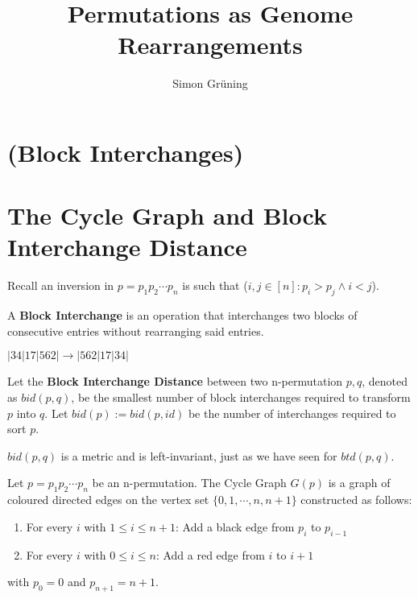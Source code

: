 


\title{Permutations as Genome Rearrangements}
\author{Simon Gr\"uning}
\address[Simon Gr\"uning]{University of Zurich, R\"{a}mistrasse 71, 8006 Zurich}


\maketitle

\section*{(Block Interchanges)}


\clearpage




\section{The Cycle Graph and Block Interchange Distance}

\begin{remark}
Recall an inversion in $p = p_1 p_2 \cdots p_n $ is such that ($ i,j \in [ n ] : p_i > p_j \wedge i < j$).
\end{remark}

\begin{definition}
A \textbf{Block Interchange} is an operation that interchanges two blocks of consecutive entries without rearranging said entries.
\end{definition}

\begin{example}
 $ |34|17|562| \rightarrow |562|17|34| $
\end{example}

\begin{definition}
Let the \textbf{Block Interchange Distance} between two n-permutation $p,q$, denoted as $bid(p,q)$, be the smallest number of block interchanges required to transform $p$ into $q$. Let $bid(p) := bid(p,id)$ be the number of interchanges required to sort $p$.
\end{definition}

\begin{remark}
$bid(p,q)$ is a metric and is left-invariant, just as we have seen for $btd(p,q)$.
\end{remark}

\begin{definition}
Let $p = p_1 p_2 \cdots p_n$ be an n-permutation. The  Cycle Graph $G(p)$ is a graph of coloured directed edges on the vertex set $\{ 0,1, \cdots ,n,n+1 \}$ constructed as follows:
\begin{enumerate}
\item For every $i$ with $1 \leq i \leq n+1$: Add a black edge from $p_i$ to $p_{i-1}$
\item For every $i$ with $0 \leq i \leq n$: Add a red edge from $i$ to $i+1$
\end{enumerate}
with $p_0 = 0$ and $p_{n+1} = n+1$.
\end{definition}

